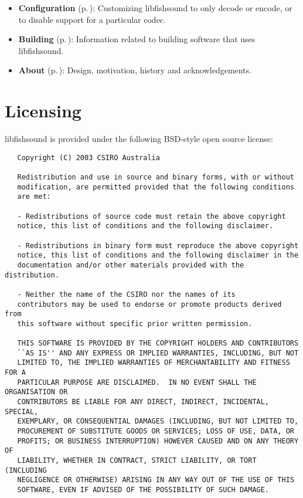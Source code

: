 \begin{itemize}
\item {\bf Configuration }{\rm (p.\,\pageref{group__configuration})}: Customizing libfishsound to only decode or encode, or to disable support for a particular codec.\end{itemize}


\begin{itemize}
\item {\bf Building }{\rm (p.\,\pageref{group__building})}: Information related to building software that uses libfishsound.\end{itemize}


\begin{itemize}
\item {\bf About }{\rm (p.\,\pageref{group__about})}: Design, motivation, history and acknowledgements.\end{itemize}
\section{Licensing}\label{Licensing}
libfishsound is provided under the following BSD-style open source license:



\footnotesize\begin{verbatim}   Copyright (C) 2003 CSIRO Australia

   Redistribution and use in source and binary forms, with or without
   modification, are permitted provided that the following conditions
   are met:
   
   - Redistributions of source code must retain the above copyright
   notice, this list of conditions and the following disclaimer.
   
   - Redistributions in binary form must reproduce the above copyright
   notice, this list of conditions and the following disclaimer in the
   documentation and/or other materials provided with the distribution.
   
   - Neither the name of the CSIRO nor the names of its
   contributors may be used to endorse or promote products derived from
   this software without specific prior written permission.
   
   THIS SOFTWARE IS PROVIDED BY THE COPYRIGHT HOLDERS AND CONTRIBUTORS
   ``AS IS'' AND ANY EXPRESS OR IMPLIED WARRANTIES, INCLUDING, BUT NOT
   LIMITED TO, THE IMPLIED WARRANTIES OF MERCHANTABILITY AND FITNESS FOR A
   PARTICULAR PURPOSE ARE DISCLAIMED.  IN NO EVENT SHALL THE ORGANISATION OR
   CONTRIBUTORS BE LIABLE FOR ANY DIRECT, INDIRECT, INCIDENTAL, SPECIAL,
   EXEMPLARY, OR CONSEQUENTIAL DAMAGES (INCLUDING, BUT NOT LIMITED TO,
   PROCUREMENT OF SUBSTITUTE GOODS OR SERVICES; LOSS OF USE, DATA, OR
   PROFITS; OR BUSINESS INTERRUPTION) HOWEVER CAUSED AND ON ANY THEORY OF
   LIABILITY, WHETHER IN CONTRACT, STRICT LIABILITY, OR TORT (INCLUDING
   NEGLIGENCE OR OTHERWISE) ARISING IN ANY WAY OUT OF THE USE OF THIS
   SOFTWARE, EVEN IF ADVISED OF THE POSSIBILITY OF SUCH DAMAGE.

\end{verbatim}
\normalsize
 